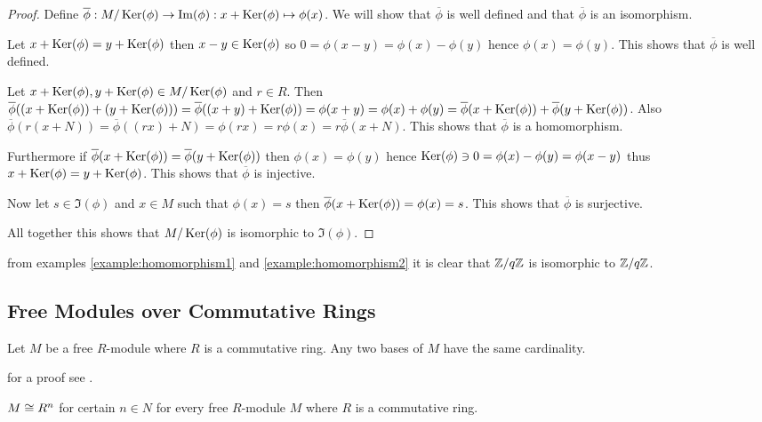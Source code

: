 \begin{proof}
	Define $\overline{\phi} : M/\operatorname{Ker}(\phi) \rightarrow \operatorname{Im}(\phi) :
	x+\operatorname{Ker}(\phi) \mapsto \phi(x)$. We will show that $\overline{\phi}$ is
	well defined and that $\overline{\phi}$ is an isomorphism.
	
	Let $x+\operatorname{Ker}(\phi)=y+\operatorname{Ker}(\phi)$ then $x-y\in\operatorname{Ker}(\phi)$ so $0 =
	\phi(x-y) = \phi(x) - \phi(y)$ hence $\phi(x)=\phi(y)$. This shows that
	$\overline{\phi}$ is well defined.
	
	Let $x+\operatorname{Ker}(\phi),y+\operatorname{Ker}(\phi)\in M/\operatorname{Ker}(\phi)$ and $r\in R$. Then
	$\overline{\phi}( (x+\operatorname{Ker}(\phi)) + (y+\operatorname{Ker}(\phi)) ) =
	\overline{\phi}((x+y)+\operatorname{Ker}(\phi)) = \phi(x+y) = \phi(x) + \phi(y) =
	\overline{\phi}(x+\operatorname{Ker}(\phi)) + \overline{\phi}(y+\operatorname{Ker}(\phi))$. Also
	$\overline{\phi}(r(x+N)) = \overline{\phi}((rx)+N) = \phi(rx) = r\phi(x)
	= r\overline{\phi}(x+N)$. This shows that $\overline{\phi}$ is a
	homomorphism.
	
	Furthermore if $\overline{\phi}(x+\operatorname{Ker}(\phi)) =
	\overline{\phi}(y+\operatorname{Ker}(\phi))$ then $\phi(x) = \phi(y)$ hence
	$\operatorname{Ker}(\phi)\ni 0 = \phi(x) - \phi(y) = \phi(x-y)$ thus $x+\operatorname{Ker}(\phi) = y
	+\operatorname{Ker}(\phi)$. This shows that $\overline{\phi}$ is injective.
	
	Now let $s\in\Im(\phi)$ and $x\in M$ such that $\phi(x)=s$ then
	$\overline{\phi}(x+\operatorname{Ker}(\phi)) = \phi(x) = s$. This shows that
	$\overline{\phi}$ is surjective.
	
	All together this shows that $M/\operatorname{Ker}(\phi)$ is isomorphic to $\Im(\phi)$.
\end{proof}

\begin{example}
	from examples \ref{example:homomorphism1} and
	\ref{example:homomorphism2} it is clear that $\mathbb{Z}/q\mathbb{Z}$ is isomorphic to
	$\mathbb{Z}/q\mathbb{Z}$.	
\end{example}

\subsection{Free Modules over Commutative Rings}

\begin{theorem}
	Let $M$ be a free $R$-module where $R$ is a commutative ring. Any two
	bases of $M$ have the same cardinality. 
\end{theorem}

for a proof see \cite{roman07}.

\begin{proposition}\label{theorem:MisRn}
	$M\cong R^{n}$ for certain $n\in N$ for every free $R$-module $M$
	where $R$ is a commutative ring.
\end{proposition}

